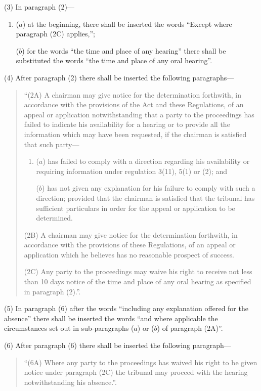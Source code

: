 \documentclass[a4paper]{article}
\begin{document}
(3) In paragraph (2)—
\begin{enumerate}\item[]
($a$) at the beginning, there shall be inserted the words “Except where paragraph (2C) applies,”;

($b$) for the words “the time and place of any hearing” there shall be substituted the words “the time and place of any oral hearing”.
\end{enumerate}

(4) After paragraph (2) there shall be inserted the following paragraphs—
\begin{quotation}
“(2A) A chairman may give notice for the determination forthwith, in accordance with the provisions of the Act and these Regulations, of an appeal or application notwithstanding that a party to the proceedings has failed to indicate his availability for a hearing or to provide all the information which may have been requested, if the chairman is satisfied that such party—
\begin{enumerate}\item[]
($a$) has failed to comply with a direction regarding his availability or requiring information under regulation 3(11), 5(1) or (2); and

($b$) has not given any explanation for his failure to comply with such a direction; provided that the chairman is satisfied that the tribunal has sufficient particulars in order for the appeal or application to be determined.
\end{enumerate}

(2B) A chairman may give notice for the determination forthwith, in accordance with the provisions of these Regulations, of an appeal or application which he believes has no reasonable prospect of success.

(2C) Any party to the proceedings may waive his right to receive not less than 10 days notice of the time and place of any oral hearing as specified in paragraph (2).”.
\end{quotation}

(5) In paragraph (6) after the words “including any explanation offered for the absence” there shall be inserted the words “and where applicable the circumstances set out in sub-paragraphs ($a$) or ($b$) of paragraph (2A)”.

(6) After paragraph (6) there shall be inserted the following paragraph—
\begin{quotation}
“(6A) Where any party to the proceedings has waived his right to be given notice under paragraph (2C) the tribunal may proceed with the hearing notwithstanding his absence.”.
\end{quotation}
\end{document}
